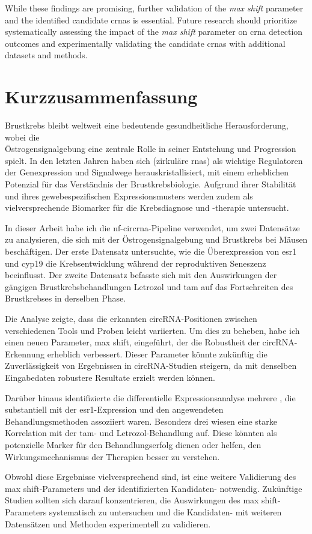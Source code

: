 While these findings are promising, further validation of the \textit{max
    shift} parameter and the identified candidate \glspl{crna} is essential.
Future research should prioritize systematically assessing the impact of the
\textit{max shift} parameter on \gls{crna} detection outcomes and
experimentally validating the candidate \glspl{crna} with additional datasets
and methods.

\newpage

\section{Kurzzusammenfassung}

Brustkrebs bleibt weltweit eine bedeutende gesundheitliche Herausforderung,
wobei die \\Östrogensignalgebung eine zentrale Rolle in seiner Entstehung und
Progression spielt.
In den letzten Jahren haben sich  (zirkuläre \Glspl{rna})
als wichtige Regulatoren der Genexpression und Signalwege herauskristallisiert,
mit einem erheblichen Potenzial für das Verständnis der Brustkrebsbiologie.
Aufgrund ihrer Stabilität und ihres gewebespezifischen Expressionsmusters
werden  zudem als vielversprechende Biomarker für die
Krebsdiagnose und -therapie untersucht.

In dieser Arbeit habe ich die \gls{nf-circrna}-Pipeline verwendet, um zwei
Datensätze zu analysieren, die sich mit der Östrogensignalgebung und Brustkrebs
bei Mäusen beschäftigen.
Der erste Datensatz untersuchte, wie die Überexpression von \Gls{esr1} und
\Gls{cyp19} die Krebsentwicklung während der reproduktiven Seneszenz
beeinflusst.
Der zweite Datensatz befasste sich mit den Auswirkungen der gängigen
Brustkrebsbehandlungen Letrozol und \Gls{tam} auf das Fortschreiten des
Brustkrebses in derselben Phase.

Die Analyse zeigte, dass die erkannten circRNA-Positionen zwischen
verschiedenen Tools und Proben leicht variierten.
Um dies zu beheben, habe ich einen neuen Parameter, max shift, eingeführt, der
die Robustheit der circRNA-Erkennung erheblich verbessert.
Dieser Parameter könnte zukünftig die Zuverlässigkeit von Ergebnissen in
circRNA-Studien steigern, da mit denselben Eingabedaten robustere Resultate
erzielt werden können.

Darüber hinaus identifizierte die differentielle Expressionsanalyse mehrere
, die substantiell mit der \gls{esr1}-Expression und den
angewendeten Behandlungsmethoden assoziiert waren.
Besonders drei  wiesen eine starke Korrelation mit der
\Gls{tam}- und Letrozol-Behandlung auf.
Diese  könnten als potenzielle Marker für den
Behandlungserfolg dienen oder helfen, den Wirkungsmechanismus der Therapien
besser zu verstehen.

Obwohl diese Ergebnisse vielversprechend sind, ist eine weitere Validierung des
max shift-Parameters und der identifizierten Kandidaten-
notwendig.
Zukünftige Studien sollten sich darauf konzentrieren, die Auswirkungen des max
shift-Parameters systematisch zu untersuchen und die
Kandidaten- mit weiteren Datensätzen und Methoden
experimentell zu validieren.
